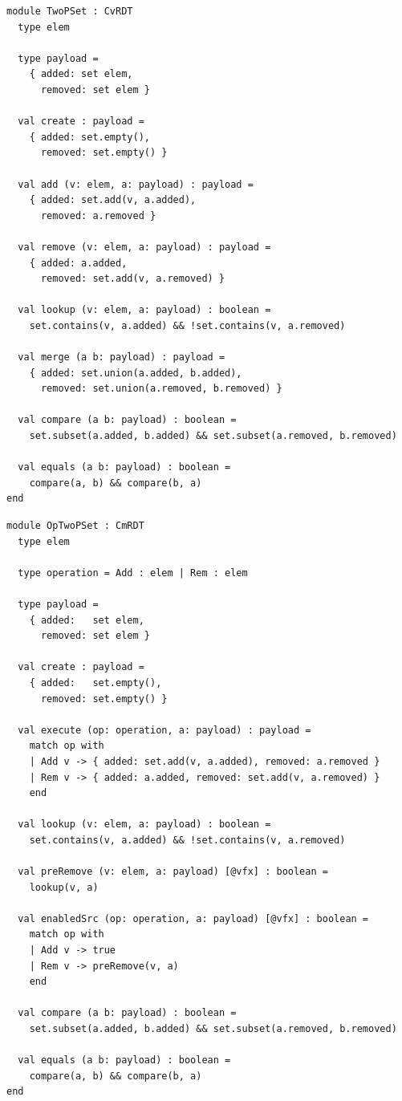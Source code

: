 \begin{lstlisting}[caption={\texttt{TwoPSet}}, label={lst:app_twopset}]
module TwoPSet : CvRDT
  type elem
  
  type payload = 
    { added: set elem,
      removed: set elem }

  val create : payload = 
    { added: set.empty(), 
      removed: set.empty() }

  val add (v: elem, a: payload) : payload =
    { added: set.add(v, a.added), 
      removed: a.removed }

  val remove (v: elem, a: payload) : payload =
    { added: a.added, 
      removed: set.add(v, a.removed) }

  val lookup (v: elem, a: payload) : boolean =
    set.contains(v, a.added) && !set.contains(v, a.removed)

  val merge (a b: payload) : payload =
    { added: set.union(a.added, b.added),
      removed: set.union(a.removed, b.removed) }

  val compare (a b: payload) : boolean =
    set.subset(a.added, b.added) && set.subset(a.removed, b.removed)

  val equals (a b: payload) : boolean =
    compare(a, b) && compare(b, a)
end
\end{lstlisting}

\begin{lstlisting}[caption={\texttt{OpTwoPSet}}, label={lst:app_optwopset}]
module OpTwoPSet : CmRDT
  type elem

  type operation = Add : elem | Rem : elem

  type payload =
    { added:   set elem,
      removed: set elem }

  val create : payload =
    { added:   set.empty(),
      removed: set.empty() }

  val execute (op: operation, a: payload) : payload =
    match op with
    | Add v -> { added: set.add(v, a.added), removed: a.removed }
    | Rem v -> { added: a.added, removed: set.add(v, a.removed) }
    end

  val lookup (v: elem, a: payload) : boolean =
    set.contains(v, a.added) && !set.contains(v, a.removed)

  val preRemove (v: elem, a: payload) [@vfx] : boolean =
    lookup(v, a)

  val enabledSrc (op: operation, a: payload) [@vfx] : boolean =
    match op with
    | Add v -> true
    | Rem v -> preRemove(v, a)
    end

  val compare (a b: payload) : boolean =
    set.subset(a.added, b.added) && set.subset(a.removed, b.removed)

  val equals (a b: payload) : boolean =
    compare(a, b) && compare(b, a)
end
\end{lstlisting}

